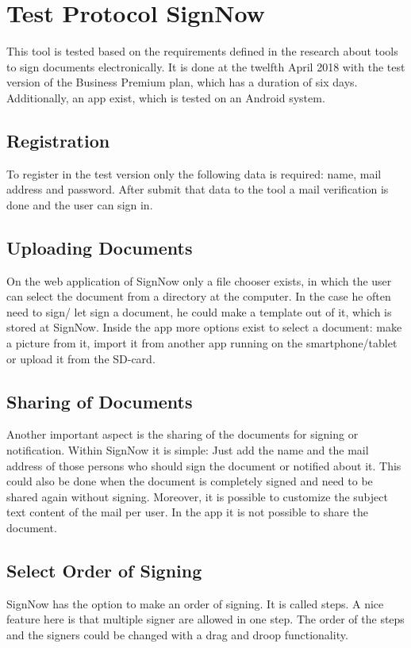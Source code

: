 \section{Test Protocol SignNow}
\label{tool:sec:signnow}
This tool is tested based on the requirements defined in the research about tools to sign documents electronically. It is done at the twelfth April 2018 with the test version of the Business Premium plan, which has a duration of six days. Additionally, an \gls{app} exist, which is tested on an Android system.

\subsection{Registration}
To register in the test version only the following data is required: name, mail address and password. After submit that data to the tool a mail verification is done and the user can sign in.

\subsection{Uploading Documents}
On the web application of SignNow only a file chooser exists, in which the user can select the document from a directory at the computer. In the case he often need to sign/ let sign a document, he could make a template out of it, which is stored at SignNow. Inside the \gls{app} more options exist to select a document: make a picture from it, import it from another \gls{app} running on the smartphone/tablet or upload it from the SD-card.  

\subsection{Sharing of Documents}
Another important aspect is the sharing of the documents for signing or notification. Within SignNow it is simple: Just add the name and the mail address of those persons who should sign the document or notified about it. This could also be done when the document is completely signed and need to be shared again without signing. Moreover, it is possible to customize the subject text content of the mail per user. In the \gls{app} it is not possible to share the document.

\subsection{Select Order of Signing}
SignNow has the option to make an order of signing. It is called steps. A nice feature here is that multiple signer are allowed in one step. The order of the steps and the signers could be changed with a drag and droop functionality.


